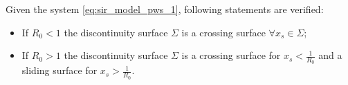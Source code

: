 \begin{theorem}
Given the system \ref{eq:sir_model_pws_1}, following statements are verified:
\begin{itemize}
    \item If $R_0 < 1$ the discontinuity surface $\Sigma$ is a crossing surface $\forall x_s \in \Sigma$;
    \item If $R_0 > 1$ the discontinuity surface $\Sigma$ is a crossing surface for $x_s < \frac{1}{R_0}$ and a sliding surface for $x_s > \frac{1}{R_0}$.
\end{itemize}
\end{theorem}